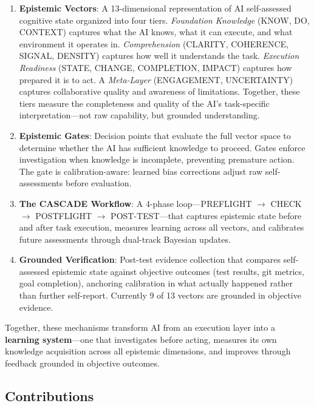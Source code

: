 \begin{enumerate}
    \item \textbf{Epistemic Vectors}: A 13-dimensional representation of AI self-assessed cognitive state organized into four tiers. \emph{Foundation Knowledge} (KNOW, DO, CONTEXT) captures what the AI knows, what it can execute, and what environment it operates in. \emph{Comprehension} (CLARITY, COHERENCE, SIGNAL, DENSITY) captures how well it understands the task. \emph{Execution Readiness} (STATE, CHANGE, COMPLETION, IMPACT) captures how prepared it is to act. A \emph{Meta-Layer} (ENGAGEMENT, UNCERTAINTY) captures collaborative quality and awareness of limitations. Together, these tiers measure the completeness and quality of the AI's task-specific interpretation---not raw capability, but grounded understanding.

    \item \textbf{Epistemic Gates}: Decision points that evaluate the full vector space to determine whether the AI has sufficient knowledge to proceed. Gates enforce investigation when knowledge is incomplete, preventing premature action. The gate is calibration-aware: learned bias corrections adjust raw self-assessments before evaluation.

    \item \textbf{The CASCADE Workflow}: A 4-phase loop---PREFLIGHT $\rightarrow$ CHECK $\rightarrow$ POSTFLIGHT $\rightarrow$ POST-TEST---that captures epistemic state before and after task execution, measures learning across all vectors, and calibrates future assessments through dual-track Bayesian updates.

    \item \textbf{Grounded Verification}: Post-test evidence collection that compares self-assessed epistemic state against objective outcomes (test results, git metrics, goal completion), anchoring calibration in what actually happened rather than further self-report. Currently 9 of 13 vectors are grounded in objective evidence.
\end{enumerate}

Together, these mechanisms transform AI from an execution layer into a \textbf{learning system}---one that investigates before acting, measures its own knowledge acquisition across all epistemic dimensions, and improves through feedback grounded in objective outcomes.

\subsection{Contributions}


